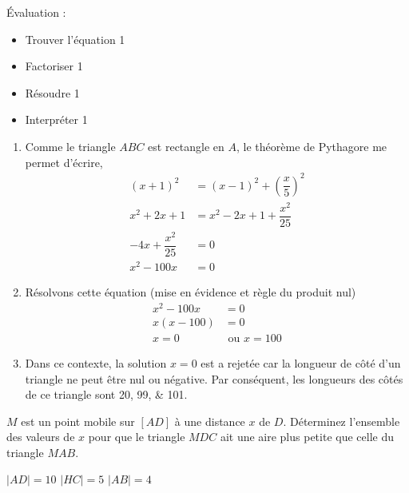 \documentclass[a4paper, 12pt, parskip=half-, twoside=semi]{scrartcl}
\begin{document}
\begin{solution}
    Évaluation :
    \begin{itemize}
        \item Trouver l'équation \hfill 1
        \item Factoriser \hfill 1
        \item Résoudre \hfill 1
        \item Interpréter \hfill 1
    \end{itemize}
    \begin{enumerate}
        \item Comme le triangle $ABC$ est rectangle en $A$, le théorème de Pythagore me permet d'écrire,
              \begin{align*}
                  (x+1)^2               & = (x-1)^2 +  \left(\dfrac{x}{5}\right)^2 \\
                  x^2+2x+1              & = x^2 - 2x + 1 + \dfrac{x^2}{25}         \\
                  -4x + \dfrac{x^2}{25} & =0                                       \\
                  x^2 -100x             & = 0
              \end{align*}
        \item Résolvons cette équation (mise en évidence et règle du produit nul)
              \begin{align*}
                  x^2 - 100x & = 0              \\
                  x(x-100)   & = 0              \\
                  x = 0      & \text{ ou }x=100
              \end{align*}
        \item Dans ce contexte, la solution $x=0$ est a rejetée car la longueur de côté d'un triangle ne peut être nul ou négative. Par conséquent, les longueurs des côtés de ce triangle sont \numlist{20;99;101}.
    \end{enumerate}

\end{solution}

\begin{transferer}[points=2]
    \(M\) est un point mobile sur \([AD]\) à une distance \(x\) de \(D\). Déterminez l'ensemble des valeurs de \(x\) pour que le triangle \(MDC\) ait une aire plus petite que celle du triangle \(MAB\).

    \parbox{3cm}{%
        \(\lvert AD \rvert=10\)\medbreak
        \(\lvert HC \rvert=5\)\medbreak
        \(\lvert AB \rvert=4\)%
    }
    \hfil
\end{transferer}
\begin{solution}

\end{solution}
\end{document}
